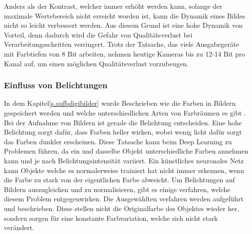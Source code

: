 \documentclass[a4paper,12pt,oneside]{article}
\begin{document}
  Anders als der Kontrast, welcher immer erhöht werden kann, solange der maximale Wertebereich nicht erreicht worden ist, kann die Dynamik eines Bildes nicht so leicht verbessert werden. Aus diesem Grund ist eine hohe Dynamik von Vorteil, denn dadurch wird die Gefahr von Qualitätsverlust bei Verarbeitungsschritten verringert. Trotz der Tatsache, das viele Ausgabegeräte mit Farbtiefen von 8 Bit arbeiten, nehmen heutige Kameras bis zu 12-14 Bit pro Kanal auf, um einen möglichen Qualitätsverlust vorzubeugen.
    \subsubsection{Einfluss von Belichtungen}\label{s.belichtung}
  In dem Kapitel\ref{s.aufbdigibilder} wurde Beschrieben wie die Farben in Bildern gespeichert werden und welche unterschiedlichen Arten von Farbräumen es gibt \cite[41ff.]{burger2009digitale}. Bei der Aufnahme von Bildern ist gerade die Belichtung entscheiden. Eine hohe Belichtung sorgt dafür, dass Farben heller wirken, wobei wenig licht dafür sorgt das Farben dunkler erscheinen. Diese Tatsache kann beim Deep Learning zu Problemen führen, da ein und dasselbe Objekt unterschiedliche Farben annehmen kann und je nach Belichtungsintensität variiert. Ein künstliches neuronales Netz kann Objekte welche es normalerweise trainiert hat nicht immer erkennen, wenn die Farbe zu stark von der eigentlichen Farbe abweicht. Um Belichtungen auf Bildern auszugleichen und zu normalisieren, gibt es einige verfahren, welche diesem Problem entgegenwirken. Die Ausgewählten verfahren werden aufgeführt und beschrieben. Diese stellen nicht die Originalfarbe des Objektes wieder her, sondern sorgen für eine konstante Farbvariation, welche sich nicht stark verändert.
\end{document}
